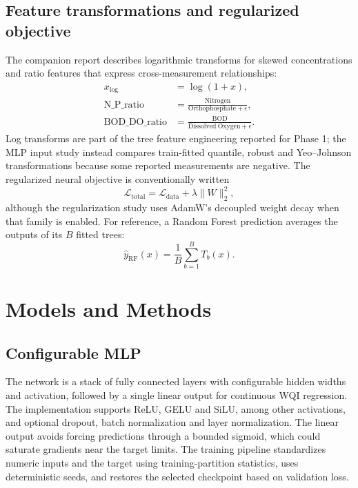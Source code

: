 \documentclass[conference]{IEEEtran}
\begin{document}
\subsection{Feature transformations and regularized objective}
The companion report describes logarithmic transforms for skewed concentrations and ratio features that express cross-measurement relationships:
\begin{align}
 x_{\log} &= \log(1+x),\\
 \mathrm{N\_P\_ratio} &= \frac{\mathrm{Nitrogen}}{\mathrm{Orthophosphate}+\epsilon},\\
 \mathrm{BOD\_DO\_ratio} &= \frac{\mathrm{BOD}}{\mathrm{Dissolved\ Oxygen}+\epsilon}.
\end{align}
Log transforms are part of the tree feature engineering reported for Phase 1; the MLP input study instead compares train-fitted quantile, robust and Yeo--Johnson transformations because some reported measurements are negative. The regularized neural objective is conventionally written
\begin{equation}
 \mathcal{L}_{\mathrm{total}} = \mathcal{L}_{\mathrm{data}} + \lambda \lVert W \rVert_2^2,
\end{equation}
although the regularization study uses AdamW's decoupled weight decay when that family is enabled.
For reference, a Random Forest prediction averages the outputs of its $B$ fitted trees:
\begin{equation}
 \hat y_{\mathrm{RF}}(x) = \frac{1}{B}\sum_{b=1}^{B} T_b(x).
\end{equation}

\section{Models and Methods}
\subsection{Configurable MLP}
The network is a stack of fully connected layers with configurable hidden widths and activation, followed by a single linear output for continuous WQI regression. The implementation supports ReLU, GELU and SiLU, among other activations, and optional dropout, batch normalization and layer normalization. The linear output avoids forcing predictions through a bounded sigmoid, which could saturate gradients near the target limits. The training pipeline standardizes numeric inputs and the target using training-partition statistics, uses deterministic seeds, and restores the selected checkpoint based on validation loss.
\end{document}
